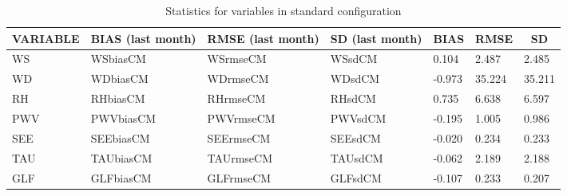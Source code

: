 \documentclass[11pt,english]{article}
\begin{document}
\clearpage
\begin{table}[]
\begin{center}
\begin{tabular}{|l|l|l|l|l|l|l|}
\hline
\multicolumn{1}{|c|}{\cellcolor[HTML]{C0C0C0}\textbf{VARIABLE}} & \multicolumn{1}{c|}{\cellcolor[HTML]{C0C0C0}\textbf{BIAS} (last month)} & \multicolumn{1}{c|}{\cellcolor[HTML]{C0C0C0}\textbf{RMSE} (last month)} & \multicolumn{1}{c|}{\cellcolor[HTML]{C0C0C0}\textbf{SD} (last month)} & \multicolumn{1}{c|}{\cellcolor[HTML]{C0C0C0}\textbf{BIAS}} & \multicolumn{1}{c|}{\cellcolor[HTML]{C0C0C0}\textbf{RMSE}} & \multicolumn{1}{c|}{\cellcolor[HTML]{C0C0C0}\textbf{SD}}\\\hline
\cellcolor[HTML]{C0C0C0}WS  & WSbiasCM     & WSrmseCM     & WSsdCM  &     0.104  &     2.487  &     2.485 \\
\cellcolor[HTML]{C0C0C0}WD  & WDbiasCM     & WDrmseCM     & WDsdCM  &    -0.973  &    35.224  &    35.211 \\
\cellcolor[HTML]{C0C0C0}RH  & RHbiasCM     & RHrmseCM     & RHsdCM  &     0.735  &     6.638  &     6.597 \\
\cellcolor[HTML]{C0C0C0}PWV & PWVbiasCM    & PWVrmseCM    & PWVsdCM &    -0.195 &     1.005 &     0.986 \\
\cellcolor[HTML]{C0C0C0}SEE & SEEbiasCM    & SEErmseCM    & SEEsdCM &    -0.020 &     0.234 &     0.233 \\
\cellcolor[HTML]{C0C0C0}TAU & TAUbiasCM    & TAUrmseCM    & TAUsdCM &    -0.062 &     2.189 &     2.188 \\
\cellcolor[HTML]{C0C0C0}GLF & GLFbiasCM    & GLFrmseCM    & GLFsdCM &    -0.107 &     0.233 &     0.207 \\
\hline
\end{tabular}
\caption{Statistics for variables in standard configuration}
\end{center}
\end{table}
\end{document}
